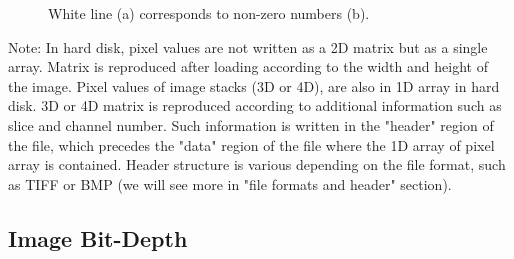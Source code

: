 \begin{figure}[htbp]
\centering
{}
\caption{ White line (a) corresponds to non-zero numbers (b).}
\label{fig:mostbasic2}
\end{figure} 


Note: In hard disk, pixel values are not written as a 2D matrix but as
a single array. Matrix is reproduced after loading according to the width
and height of the image. Pixel values of image stacks (3D or 4D), are
also in 1D array in hard disk. 3D or 4D matrix is reproduced according
to additional information such as slice and channel number. Such
information is written in the
"header" region of the file, which
precedes the "data" region of the
file where the 1D array of pixel array is contained. Header structure
is various depending on the file format, such as TIFF or BMP (we will
see more in "file formats and
header" section). 



\subsection{Image Bit-Depth}

